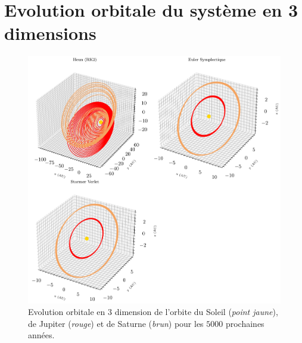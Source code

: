 \documentclass[11pt,twoside=semi,openright,numbers=noenddot]{article}
\begin{document}
\newpage
\appendix
\appendixpage
\addappheadtotoc

\section{Evolution orbitale du système en 3 dimensions}
\begin{figure}[H]
  \centering
  \includegraphics{figures/5000_years/orbital-plot3d.png}
  \caption{Evolution orbitale en $3$ dimension de l'orbite du Soleil (\emph{point jaune}), de Jupiter (\emph{rouge}) et de Saturne (\emph{brun}) pour les $5000$ prochaines années.}
  \label{fig:orbital-plot3D--5000}
\end{figure}
\end{document}
